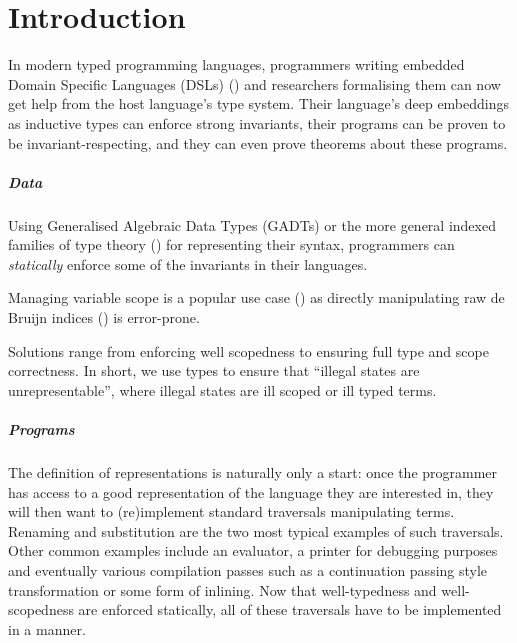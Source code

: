 \chapter{Introduction}

In modern typed programming languages, programmers writing embedded Domain
Specific Languages (DSLs) (\cite{hudak1996building}) and researchers
formalising them can now get help from the host language's type system.
Their language's deep embeddings as inductive types can enforce strong
invariants, their programs can be proven to be invariant-respecting,
and they can even prove theorems about these programs.

\paragraph{Data} Using Generalised Algebraic Data Types (GADTs) or the more
general indexed families of type theory (\cite{dybjer1994inductive}) for
representing their syntax, programmers can \emph{statically} enforce some of
the invariants in their languages.

Managing variable scope is a popular use case
(\cite{BELLEGARDE1994287,bird_paterson_1999,altenkirch1999monadic}) as directly
manipulating raw de Bruijn indices (\cite{de1972lambda}) is error-prone.


Solutions range from enforcing well scopedness to ensuring full type and scope
correctness. In short, we use types to ensure that ``illegal states are unrepresentable'',
where illegal states are ill scoped or ill typed terms.

\paragraph{Programs} The definition of \scopeandtypesafe{} representations is naturally only a start:
once the programmer has access to a good representation of the language they are
interested in, they will then want to (re)implement standard traversals
manipulating terms. Renaming and substitution are the two most typical examples
of such traversals. Other common examples include an evaluator, a printer for
debugging purposes and eventually various compilation passes such as a continuation
passing style transformation or some form of inlining. Now that well-typedness
and well-scopedness are enforced statically, all of these traversals have to be
implemented in a \scopeandtypesafe{} manner.

